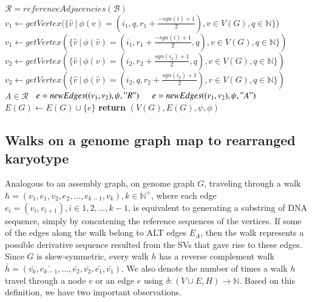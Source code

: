 \documentclass[phd,tocprelim]{cornell}
\begin{document}
\begin{algorithm}[h!]
    \begin{algorithmic}
        \State $\mathcal{R} = referenceAdjacencies(\mathcal{B})$  
        \State $v_1 \gets getVertex(\{ \hat{v} \ | \ \phi(v) = (i_1, q, r_1+\frac{-sgn(i)+1}{2}), v \in V(G), q \in \mathbb{N}\}$)
        \Else
        \State $v_1 \gets getVertex(\{ \hat{v} \ | \ \phi(\hat{v}) = (i_1, r_1 + \frac{-sgn(i)+1}{2}, q), v \in V(G), q \in \mathbb{N}\})$
        \EndIf
        \State $v_2 \gets getVertex(\{ \hat{v} \ | \ \phi(v) = (i_2, r_2 + \frac{sgn(i_2)+1}{2}, q), v \in V(G), q \in \mathbb{N}\})$
        \Else
        \State $v_2 \gets getVertex(\{ \hat{v} \ | \ \phi(\hat{v}) = (i_2, q, r_2 + \frac{sgn(i_2)+1}{2}), v \in V(G), q \in \mathbb{N} \})$
        \EndIf
        \State \algorithmicif\ $A \in \mathcal{R}$ \algorithmicthen\ $e = newEdges((v_1, v_2), \psi, "R")$ \ \algorithmicelse \ $e = newEdges((v_1, v_2), \psi, "A")$
        \State $E(G) \gets E(G) \cup \{e\}$
        \EndFor
        \State \textbf{return} $(V(G), E(G), \psi, \phi)$
        \EndProcedure
    \end{algorithmic}
\end{algorithm}

\newpage

\subsection{Walks on a genome graph map to rearranged karyotype}
Analogous to an assembly graph, on genome graph $G$, traveling through a walk $h = (v_1, e_1, v_2, e_2, \dots, e_{k-1}, v_k), k \in \mathbb{N^+}$, where each edge $e_i = (v_i, v_{i+1}), i \in 1, 2, \dots, k-1$, is equivalent to generating a substring of DNA sequence, simply by concatening the reference sequences of the vertices. If some of the edges along the walk belong to ALT edges $E_{A}$, then the walk represents a possible derivative sequence resulted from the SVs that gave rise to these edges. Since $G$ is skew-symmetric, every walk $h$ has a reverse complement walk $\bar{h} = (\bar{v_k}, \bar{e_{k-1}}, \dots, \bar{e_2}, \bar{v_2}, \bar{e_1}, \bar{v_1})$. We also denote the number of times a walk $h$ travel through a node $v$ or an edge $e$ using $\delta : (V \cup E, H) \rightarrow \mathbb{N}$. Based on this definition, we have two important observations.
\end{document}
